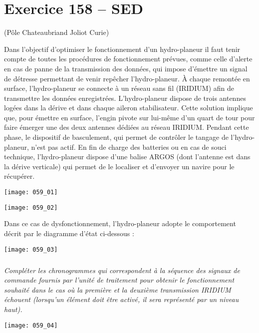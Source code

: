 \section*{Exercice 158 -- SED}
(Pôle Chateaubriand Joliot Curie)

\setcounter{exo}{0}


Dans l’objectif d’optimiser le fonctionnement d’un hydro-planeur il faut tenir compte de toutes les procédures de fonctionnement prévues, comme celle d’alerte en cas de panne de la transmission des données, qui impose d’émettre un signal de détresse permettant de venir repêcher l’hydro-planeur.
À chaque remontée en surface, l’hydro-planeur se connecte à un réseau sans fil (IRIDIUM) afin de transmettre les données enregistrées. L'hydro-planeur dispose de trois antennes logées dans la dérive et dans chaque aileron stabilisateur. Cette solution implique que, pour émettre en surface, l’engin pivote sur lui-même d’un quart de tour pour faire émerger une des deux antennes dédiées au réseau IRIDIUM. Pendant cette phase, le dispositif de basculement, qui permet de contrôler le tangage de l’hydro-planeur, n’est pas actif.
En fin de charge des batteries ou en cas de souci technique, l’hydro-planeur dispose d’une balise ARGOS (dont l'antenne est dans la dérive verticale) qui permet de le localiser et d’envoyer un navire pour le récupérer.

\begin{center}
\texttt{[image: 059\_01]}
\end{center}


\begin{center}
\texttt{[image: 059\_02]}
\end{center}

Dans ce cas de dysfonctionnement, l’hydro-planeur adopte le comportement décrit par le diagramme d’état ci-dessous :


\begin{center}
\texttt{[image: 059\_03]}
\end{center}

\subparagraph{}
\textit{Compléter les chronogrammes qui correspondent à la séquence des signaux de commande fournis par l’unité de traitement pour obtenir le fonctionnement souhaité dans le cas où la première et la deuxième transmission IRIDIUM échouent (lorsqu’un élément doit être activé, il sera représenté par un niveau haut).}

\begin{center}
\texttt{[image: 059\_04]}
\end{center}